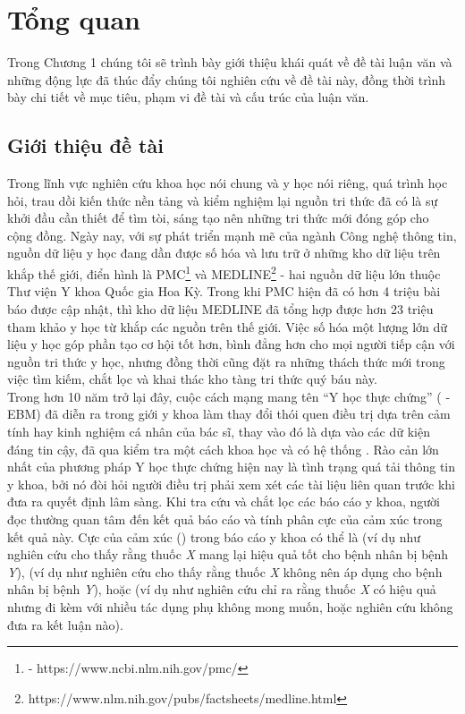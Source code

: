 \chapter{Tổng quan}
\thispagestyle{empty}
Trong Chương 1 chúng tôi sẽ trình bày giới thiệu khái quát về đề tài luận văn và những động lực đã thúc đẩy chúng tôi nghiên cứu về đề tài này, đồng thời trình bày chi tiết về mục tiêu, phạm vi đề tài và cấu trúc của luận văn.
\pagebreak
\section{Giới thiệu đề tài}
Trong lĩnh vực nghiên cứu khoa học nói chung và y học nói riêng, quá trình học hỏi, trau dồi kiến thức nền tảng và kiểm nghiệm lại nguồn tri thức đã có là sự khởi đầu cần thiết để tìm tòi, sáng tạo nên những tri thức mới đóng góp cho cộng đồng. Ngày nay, với sự phát triển mạnh mẽ của ngành Công nghệ thông tin, nguồn dữ liệu y học đang dần được số hóa và lưu trữ ở những kho dữ liệu trên khắp thế giới, điển hình là PMC\footnote{ - https://www.ncbi.nlm.nih.gov/pmc/} và MEDLINE\footnote{https://www.nlm.nih.gov/pubs/factsheets/medline.html} - hai nguồn dữ liệu lớn thuộc Thư viện Y khoa Quốc gia Hoa Kỳ. Trong khi PMC hiện đã có hơn 4 triệu bài báo được cập nhật, thì kho dữ liệu MEDLINE đã tổng hợp được hơn 23 triệu tham khảo y học từ khắp các nguồn trên thế giới. Việc số hóa một lượng lớn dữ liệu y học góp phần tạo cơ hội tốt hơn, bình đẳng hơn cho mọi người tiếp cận với nguồn tri thức y học, nhưng đồng thời cũng đặt ra những thách thức mới trong việc tìm kiếm, chắt lọc và khai thác kho tàng tri thức quý báu này.\\

Trong hơn 10 năm trở lại đây, cuộc cách mạng mang tên ``Y học thực chứng'' ( - EBM) đã diễn ra trong giới y khoa làm thay đổi thói quen điều trị dựa trên cảm tính hay kinh nghiệm cá nhân của bác sĩ, thay vào đó là dựa vào các dữ kiện đáng tin cậy, đã qua kiểm tra một cách khoa học và có hệ thống \cite{Nguyen2004}. Rào cản lớn nhất của phương pháp Y học thực chứng hiện nay là tình trạng quá tải thông tin y khoa, bởi nó đòi hỏi người điều trị phải xem xét các tài liệu liên quan trước khi đưa ra quyết định lâm sàng. Khi tra cứu và chắt lọc các báo cáo y khoa, người đọc thường quan tâm đến kết quả báo cáo và tính phân cực của cảm xúc trong kết quả này. Cực của cảm xúc () trong báo cáo y khoa có thể là \tichcuc (ví dụ như nghiên cứu cho thấy rằng thuốc \textit{X} mang lại hiệu quả tốt cho bệnh nhân bị bệnh \textit{Y}), \tieucuc (ví dụ như nghiên cứu cho thấy rằng thuốc \textit{X} không nên áp dụng cho bệnh nhân bị bệnh \textit{Y}), hoặc \trungtinh (ví dụ như nghiên cứu chỉ ra rằng thuốc \textit{X} có hiệu quả nhưng đi kèm với nhiều tác dụng phụ không mong muốn, hoặc nghiên cứu không đưa ra kết luận nào).\\

